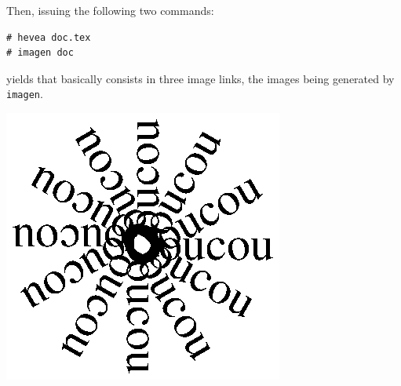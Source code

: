 Then, issuing the following two commands:
\begin{verbatim}
# hevea doc.tex
# imagen doc
\end{verbatim}
yields \html{} that basically consists in three image links,
the images being generated by \texttt{imagen}.
\ifhevea
\begin{htmlout}
\begin{center}
\includegraphics{round.ps}
\end{center}
\end{htmlout}

